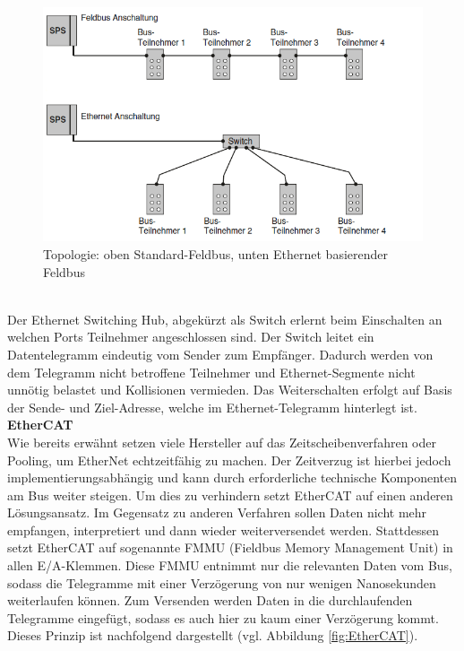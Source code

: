 \documentclass[ a4paper,
                oneside,
                toc=bibliography,
                toc=listof
                ]{scrbook}
\begin{document}
	\begin{figure}[!ht]
		\centering
		\includegraphics[width=1.0\linewidth]{./images/Feldbus vs Ethernet Anschaltung.png}
		\caption{Topologie: oben Standard-Feldbus, unten Ethernet basierender Feldbus \cite{hering2012elektrotechnik}}
		\label{fig:TopologieEthernet}
	\end{figure}\\
	Der Ethernet Switching Hub, abgekürzt als Switch erlernt beim Einschalten an welchen Ports  Teilnehmer angeschlossen sind. Der Switch leitet ein Datentelegramm eindeutig vom Sender zum Empfänger. Dadurch werden von dem Telegramm nicht betroffene Teilnehmer und Ethernet-Segmente nicht unnötig belastet und Kollisionen vermieden. Das Weiterschalten erfolgt auf Basis der Sende- und Ziel-Adresse, welche im Ethernet-Telegramm hinterlegt ist. \cite{hering2012elektrotechnik} \\
	\textbf{EtherCAT} \\
	Wie bereits erwähnt setzen viele Hersteller auf das Zeitscheibenverfahren oder Pooling, um EtherNet echtzeitfähig zu machen. Der Zeitverzug ist hierbei jedoch implementierungsabhängig und kann durch erforderliche technische Komponenten am Bus weiter steigen. Um dies zu verhindern setzt EtherCAT auf einen anderen Lösungsansatz. Im Gegensatz zu anderen Verfahren sollen Daten nicht mehr empfangen, interpretiert und dann wieder weiterversendet werden. Stattdessen setzt EtherCAT auf sogenannte FMMU (Fieldbus Memory Management Unit) in allen E/A-Klemmen. Diese FMMU entnimmt nur die relevanten Daten vom Bus, sodass die Telegramme mit einer Verzögerung von nur wenigen Nanosekunden weiterlaufen können. Zum Versenden werden Daten in die durchlaufenden Telegramme eingefügt, sodass es auch hier zu kaum einer Verzögerung kommt. Dieses Prinzip ist nachfolgend dargestellt (vgl. Abbildung \ref{fig:EtherCAT}).
\end{document}

